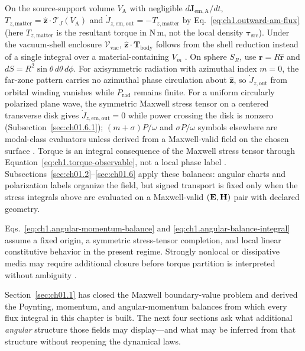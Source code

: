 On the source-support volume $V_{\mathrm{A}}$ with negligible $d\mathbf{J}_{\mathrm{em,A}}/dt$,
\(T_{z,\mathrm{matter}}=\hat{\mathbf{z}}\cdot\boldsymbol{\mathcal{T}}_J(V_{\mathrm{A}})\)
and \(\dot J_{z,\mathrm{em,out}}=-T_{z,\mathrm{matter}}\) by Eq.~\eqref{eq:ch1.outward-am-flux} (here $T_{z,\mathrm{matter}}$ is the resultant torque in N\,m, not the local density $\boldsymbol{\tau}_{\mathrm{src}}$). Under the vacuum-shell enclosure $\mathcal{V}_{\mathrm{vac}}$, \(\hat{\mathbf{z}}\cdot\mathbf{T}_{\mathrm{body}}\) follows from the shell reduction instead of a single integral over a material-containing $V_m$ \cite{harrington2001}.
On sphere \(S_R\), use \(\mathbf{r}=R\hat{\mathbf{r}}\) and
\(dS=R^2\sin\theta\,d\theta\,d\phi\). For axisymmetric radiation with azimuthal index $m=0$, the far-zone pattern carries no azimuthal phase circulation about $\hat{\mathbf{z}}$, so $\dot J_{z,\mathrm{out}}$ from orbital winding vanishes while $P_{\mathrm{rad}}$ remains finite. For a uniform circularly polarized plane wave, the symmetric Maxwell stress tensor on a centered transverse disk gives $\dot J_{z,\mathrm{em,out}}=0$ while power crossing the disk is nonzero (Subsection~\ref{sec:ch01.6.1}); $(m+\sigma)P/\omega$ and $\sigma P/\omega$ symbols elsewhere are modal-class evaluators unless derived from a Maxwell-valid field on the chosen surface \cite{beth1936,stratton1941}.
Torque is an integral consequence of the Maxwell stress tensor through Equation~\eqref{eq:ch1.torque-observable}, not a local phase label
\cite{stratton1941}. Subsections~\ref{sec:ch01.2}--\ref{sec:ch01.6} apply these balances: angular charts and polarization labels organize the field, but signed transport is fixed only when the stress integrals above are evaluated on a Maxwell-valid $(\mathbf{E},\mathbf{H})$ pair with declared geometry.

Eqs.~\eqref{eq:ch1.angular-momentum-balance}
and \eqref{eq:ch1.angular-balance-integral} assume a fixed origin, a symmetric
stress-tensor completion, and local linear constitutive behavior in the present
regime. Strongly nonlocal or dissipative media may require additional closure before
torque partition is interpreted without ambiguity \cite{stratton1941}.

Section~\ref{sec:ch01.1} has closed the Maxwell boundary-value problem and derived the Poynting, momentum, and angular-momentum balances from which every flux integral in this chapter is built. The next four sections ask what additional \emph{angular} structure those fields may display---and what may be inferred from that structure without reopening the dynamical laws.

